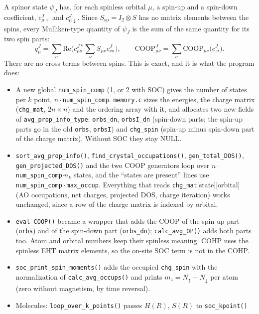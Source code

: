 \documentclass[11pt,a4paper]{article}
\newcommand{\file}[1]{\texttt{#1}}
\newcommand{\fn}[1]{\texttt{#1()}}
\newcommand{\var}[1]{\texttt{#1}}
\begin{document}
A spinor state $\psi_J$ has, for each spinless orbital $\mu$, a spin-up and a spin-down
coefficient, $c_{\mu\uparrow}^J$ and $c_{\mu\downarrow}^J$. Since
$S_{\mathrm{sp}}=I_2\otimes S$ has no matrix elements between the spins, every
Mulliken-type quantity of $\psi_J$ is the sum of the same quantity for its two spin parts:
\begin{equation}
q^J_\mu = \sum_{\sigma}\mathrm{Re}\Big(c^{J*}_{\mu\sigma}\sum_\nu S_{\mu\nu}c^J_{\nu\sigma}\Big),
\qquad
\mathrm{COOP}^J_{\mu\nu} = \sum_\sigma \mathrm{COOP}_{\mu\nu}\big(c^J_{\cdot\sigma}\big).
\end{equation}
There are no cross terms between spins. This is exact, and it is what the program does:
\begin{itemize}
\item A new global \var{num\_spin\_comp} (1, or 2 with SOC) gives the number of states per
  $k$ point, $n\cdot$\var{num\_spin\_comp}. \file{memory.c} sizes the energies, the charge
  matrix (\var{chg\_mat}, $2n\times n$) and the ordering array with it, and allocates two
  new fields of \var{avg\_prop\_info\_type}: \var{orbs\_dn}, \var{orbsI\_dn} (spin-down
  parts; the spin-up parts go in the old \var{orbs}, \var{orbsI}) and \var{chg\_spin}
  (spin-up minus spin-down part of the charge matrix). Without SOC they stay NULL.
\item \fn{sort\_avg\_prop\_info}, \fn{find\_crystal\_occupations}, \fn{gen\_total\_DOS},
  \fn{gen\_projected\_DOS} and the two COOP generators loop over
  $n\cdot$\var{num\_spin\_comp}$\cdot n_k$ states, and the ``states are present'' lines use
  \var{num\_spin\_comp}\,$\cdot$\,\var{max\_occup}. Everything that reads
  \var{chg\_mat}[state][orbital] (AO occupations, net charges, projected DOS, charge
  iteration) works unchanged, since a row of the charge matrix is indexed by orbital.
\item \fn{eval\_COOP} became a wrapper that adds the COOP of the spin-up part
  (\var{orbs}) and of the spin-down part (\var{orbs\_dn}); \fn{calc\_avg\_OP} adds both
  parts too. Atom and orbital numbers keep their spinless meaning. COHP uses the
  spinless EHT matrix elements, so the on-site SOC term is not in the COHP.
\item \fn{soc\_print\_spin\_moments} adds the occupied \var{chg\_spin} with the
  normalization of \fn{calc\_avg\_occups} and prints $m_z=N_\uparrow-N_\downarrow$ per atom
  (zero without magnetism, by time reversal).
\item Molecules: \fn{loop\_over\_k\_points} passes $H(R)$, $S(R)$ to \fn{soc\_kpoint}

\end{itemize}
\end{document}
